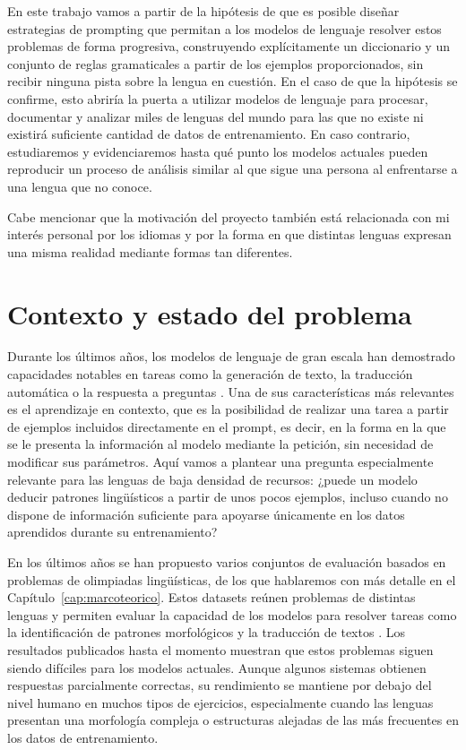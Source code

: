 En este trabajo vamos a partir de la hipótesis de que es posible diseñar estrategias de prompting que permitan a los modelos de lenguaje resolver estos problemas de forma progresiva, construyendo explícitamente un diccionario y un conjunto de reglas gramaticales a partir de los ejemplos proporcionados, sin recibir ninguna pista sobre la lengua en cuestión. En el caso de que la hipótesis se confirme, esto abriría la puerta a utilizar modelos de lenguaje para procesar, documentar y analizar miles de lenguas del mundo para las que no existe ni existirá suficiente cantidad de datos de entrenamiento. En caso contrario, estudiaremos y evidenciaremos hasta qué punto los modelos actuales pueden reproducir un proceso de análisis similar al que sigue una persona al enfrentarse a una lengua que no conoce.

Cabe mencionar que la motivación del proyecto también está relacionada con mi interés personal por los idiomas y por la forma en que distintas lenguas expresan una misma realidad mediante formas tan diferentes.

\section{Contexto y estado del problema}

Durante los últimos años, los modelos de lenguaje de gran escala han demostrado capacidades notables en tareas como la generación de texto, la traducción automática o la respuesta a preguntas \citep{brown2020language}. Una de sus características más relevantes es el aprendizaje en contexto, que es la posibilidad de realizar una tarea a partir de ejemplos incluidos directamente en el prompt, es decir, en la forma en la que se le presenta la información al modelo mediante la petición, sin necesidad de modificar sus parámetros. Aquí vamos a plantear una pregunta especialmente relevante para las lenguas de baja densidad de recursos: ¿puede un modelo deducir patrones lingüísticos a partir de unos pocos ejemplos, incluso cuando no dispone de información suficiente para apoyarse únicamente en los datos aprendidos durante su entrenamiento?

En los últimos años se han propuesto varios conjuntos de evaluación basados en problemas de olimpiadas lingüísticas, de los que hablaremos con más detalle en el Capítulo~\ref{cap:marcoteorico}. Estos datasets reúnen problemas de distintas lenguas y permiten evaluar la capacidad de los modelos para resolver tareas como la identificación de patrones morfológicos y la traducción de textos \citep{sahin2020puzzling,chi2024modeling,sanchez2024linguini,bean2024lingoly}. Los resultados publicados hasta el momento muestran que estos problemas siguen siendo difíciles para los modelos actuales. Aunque algunos sistemas obtienen respuestas parcialmente correctas, su rendimiento se mantiene por debajo del nivel humano en muchos tipos de ejercicios, especialmente cuando las lenguas presentan una morfología compleja o estructuras alejadas de las más frecuentes en los datos de entrenamiento.

